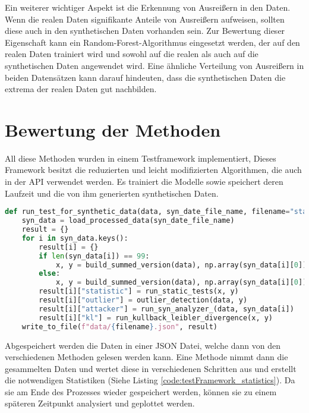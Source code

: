 Ein weiterer wichtiger Aspekt ist die Erkennung von Ausreißern in den Daten. Wenn die realen Daten signifikante Anteile von Ausreißern aufweisen, sollten diese auch in den synthetischen Daten vorhanden sein. 
Zur Bewertung dieser Eigenschaft kann ein Random-Forest-Algorithmus eingesetzt werden, der auf den realen Daten trainiert wird und sowohl auf die realen als auch auf die synthetischen Daten angewendet wird. 
Eine ähnliche Verteilung von Ausreißern in beiden Datensätzen kann darauf hindeuten, dass die synthetischen Daten die extrema der realen Daten gut nachbilden.



\section{Bewertung der Methoden}
\label{sec:method_evaluation}
All diese Methoden wurden in einem Testframework implementiert,
Dieses Framework besitzt die reduzierten und leicht modifizierten Algorithmen, die auch in der \ac{API} verwendet werden. Es trainiert die Modelle sowie speichert deren Laufzeit und die von ihm generierten synthetischen Daten.

\begin{lstlisting}[language=Python, caption={Methode um Statistiken aus den generierten Daten zu erstellen}, label={code:testFramework_statistics}]
def run_test_for_synthetic_data(data, syn_date_file_name, filename="statistic"):
    syn_data = load_processed_data(syn_date_file_name)
    result = {}
    for i in syn_data.keys():
        result[i] = {}
        if len(syn_data[i]) == 99:
            x, y = build_summed_version(data), np.array(syn_data[i][0])
        else:
            x, y = build_summed_version(data), np.array(syn_data[i][0])
        result[i]["statistic"] = run_static_tests(x, y)
        result[i]["outlier"] = outlier_detection(data, y)
        result[i]["attacker"] = run_syn_analyzer_(data, syn_data[i])
        result[i]["kl"] = run_kullback_leibler_divergence(x, y)
    write_to_file(f"data/{filename}.json", result)
\end{lstlisting}


Abgespeichert werden die Daten in einer JSON Datei, welche dann von den verschiedenen Methoden gelesen werden kann.
Eine Methode nimmt dann die gesammelten Daten und wertet diese in verschiedenen Schritten aus und erstellt die notwendigen Statistiken (Siehe Listing \ref{code:testFramework_statistics}).
Da sie am Ende des Prozesses wieder gespeichert werden, können sie zu einem späteren Zeitpunkt analysiert und geplottet werden.


